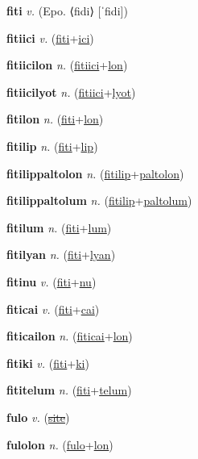 \textbf{\hypertarget{fiti}{fiti}} \textit{v.} (Epo. ⟨fidi⟩ [ˈfidi])


\textbf{\hypertarget{fitiici}{fitiici}} \textit{v.} (\hyperlink{fiti}{fiti}+\allowbreak \hyperlink{ici}{ici})


\textbf{\hypertarget{fitiicilon}{fitiicilon}} \textit{n.} (\hyperlink{fitiici}{fitiici}+\allowbreak \hyperlink{lon}{lon})


\textbf{\hypertarget{fitiicilyot}{fitiicilyot}} \textit{n.} (\hyperlink{fitiici}{fitiici}+\allowbreak \hyperlink{lyot}{lyot})


\textbf{\hypertarget{fitilon}{fitilon}} \textit{n.} (\hyperlink{fiti}{fiti}+\allowbreak \hyperlink{lon}{lon})


\textbf{\hypertarget{fitilip}{fitilip}} \textit{n.} (\hyperlink{fiti}{fiti}+\allowbreak \hyperlink{lip}{lip})


\textbf{\hypertarget{fitilippaltolon}{fitilippaltolon}} \textit{n.} (\hyperlink{fitilip}{fitilip}+\allowbreak \hyperlink{paltolon}{paltolon})


\textbf{\hypertarget{fitilippaltolum}{fitilippaltolum}} \textit{n.} (\hyperlink{fitilip}{fitilip}+\allowbreak \hyperlink{paltolum}{paltolum})


\textbf{\hypertarget{fitilum}{fitilum}} \textit{n.} (\hyperlink{fiti}{fiti}+\allowbreak \hyperlink{lum}{lum})


\textbf{\hypertarget{fitilyan}{fitilyan}} \textit{n.} (\hyperlink{fiti}{fiti}+\allowbreak \hyperlink{lyan}{lyan})


\textbf{\hypertarget{fitinu}{fitinu}} \textit{v.} (\hyperlink{fiti}{fiti}+\allowbreak \hyperlink{nu}{nu})


\textbf{\hypertarget{fiticai}{fiticai}} \textit{v.} (\hyperlink{fiti}{fiti}+\allowbreak \hyperlink{cai}{cai})


\textbf{\hypertarget{fiticailon}{fiticailon}} \textit{n.} (\hyperlink{fiticai}{fiticai}+\allowbreak \hyperlink{lon}{lon})


\textbf{\hypertarget{fitiki}{fitiki}} \textit{v.} (\hyperlink{fiti}{fiti}+\allowbreak \hyperlink{ki}{ki})


\textbf{\hypertarget{fititelum}{fititelum}} \textit{n.} (\hyperlink{fiti}{fiti}+\allowbreak \hyperlink{telum}{telum})


\textbf{\hypertarget{fulo}{fulo}} \textit{v.} (\hyperlink{site}{\sout{site}})


\textbf{\hypertarget{fulolon}{fulolon}} \textit{n.} (\hyperlink{fulo}{fulo}+\allowbreak \hyperlink{lon}{lon})


